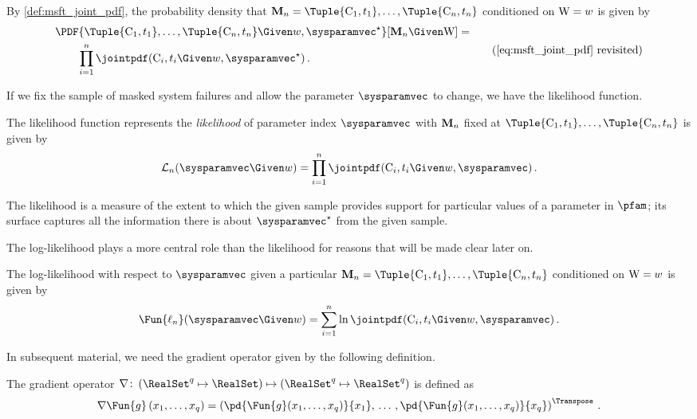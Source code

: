 \documentclass[../main.tex]{subfiles}
\begin{document}
By \cref{def:msft_joint_pdf}, the probability density that $\mfs = \Tuple{\cand_1,t_1},\ldots,\Tuple{\cand_n,t_n}$ conditioned on $\mathrm{W} = w$ is given by
\begin{equation*}
\begin{split}
& \PDF{\Tuple{\cand_1,t_1},\ldots,\Tuple{\cand_n,t_n} \Given w, \tparam{\sysparamvec}}[\mfs \Given \RV{W}] =\\
    & \qquad \prod_{i=1}^{n} \jointpdf(\cand_i, t_i \Given w, \tparam\sysparamvec)\,.
\end{split}
\tag{\ref{eq:msft_joint_pdf} revisited}
\end{equation*}

If we fix the sample of masked system failures and allow the parameter $\sysparamvec$ to change, we have the likelihood function.
\begin{definition}
\label{def:likelihood_func}
The likelihood function represents the \emph{likelihood} of parameter index $\sysparamvec$ with $\mathbf{M}_n$ fixed at $\Tuple{\cand_1,t_1},\ldots,\Tuple{\cand_n,t_n}$ is given by
\begin{equation}
    \likelihood_n(\sysparamvec \Given w) = \prod_{i=1}^{n} \jointpdf(\cand_i, t_i \Given w, \sysparamvec)\,.
\end{equation}
\end{definition}
The likelihood is a measure of the extent to which the given sample provides support for particular values of a parameter in $\pfam$;
its surface captures all the information there is about $\tparam\sysparamvec$ from the given sample.

The log-likelihood plays a more central role than the likelihood for reasons that will be made clear later on.
\begin{definition}
\label{def:general_log_like}
The log-likelihood with respect to $\sysparamvec$ given a particular $\mfs = \Tuple{\cand_1,t_1},\ldots,\Tuple{\cand_n,t_n}$ conditioned on $\mathrm{W} = w$ is given by
\begin{equation}
\label{eq:log_like_mle}
\Fun{\ell_n}(\sysparamvec \Given w) = \sum_{i=1}^{n} \ln \jointpdf(\cand_i, t_i \Given w, \sysparamvec)\,.
\end{equation}
\end{definition}






In subsequent material, we need the gradient operator given by the following definition.
\begin{definition}
The gradient operator $\nabla \colon \left(\RealSet^q \mapsto \RealSet\right) \mapsto \left(\RealSet^q \mapsto \RealSet^q\right)$ is defined as
\begin{equation}
    \nabla \Fun{g}\left(x_1,\ldots,x_q\right) = \left (
        \pd{\Fun{g}(x_1,\ldots,x_q)}{x_1},\,
        \ldots\,,
        \pd{\Fun{g}(x_1,\ldots,x_q)}{x_q}
    \right )^{\Transpose}\,.
\end{equation}
\end{definition}
\end{document}
